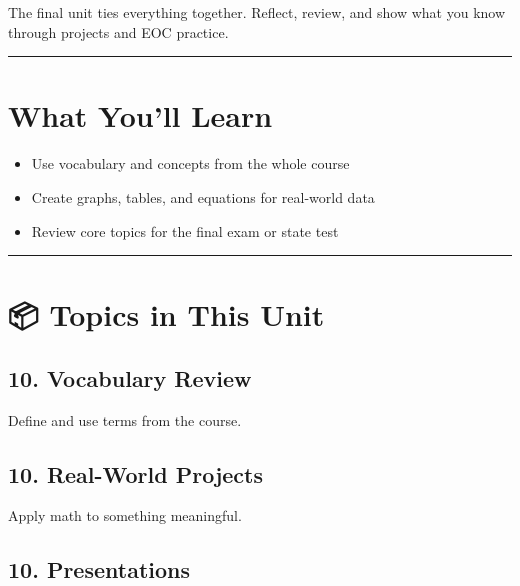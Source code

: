 \documentclass[
  letterpaper,
  DIV=11,
  numbers=noendperiod]{scrreprt}
\providecommand{\tightlist}{%
  \setlength{\itemsep}{0pt}\setlength{\parskip}{0pt}}
\begin{document}
The final unit ties everything together. Reflect, review, and show what
you know through projects and EOC practice.

\begin{center}\rule{0.5\linewidth}{0.5pt}\end{center}

\section*{What You'll Learn}\label{what-youll-learn-9}


\begin{itemize}
\tightlist
\item
  Use vocabulary and concepts from the whole course
\item
  Create graphs, tables, and equations for real-world data
\item
  Review core topics for the final exam or state test
\end{itemize}

\begin{center}\rule{0.5\linewidth}{0.5pt}\end{center}

\section*{📦 Topics in This Unit}\label{topics-in-this-unit-9}


\subsection*{10. Vocabulary Review}\label{vocabulary-review}

Define and use terms from the course.

\subsection*{10. Real-World Projects}\label{real-world-projects}

Apply math to something meaningful.

\subsection*{10. Presentations}\label{presentations}
\end{document}
